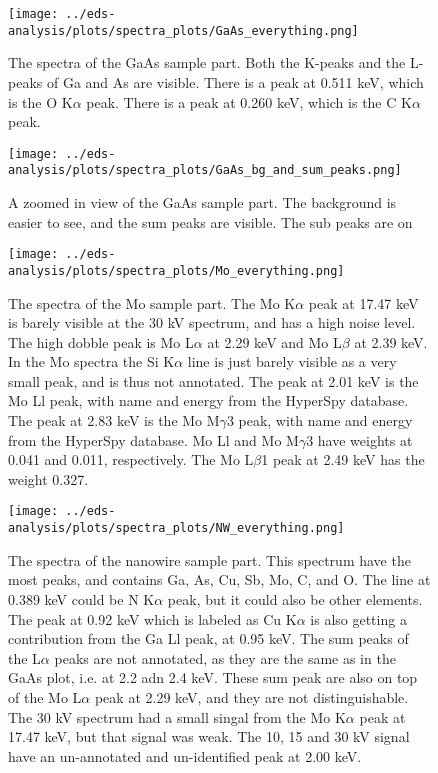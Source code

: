 \begin{figure}
    \centering
    \texttt{[image: ../eds-analysis/plots/spectra\_plots/GaAs\_everything.png]}
    \caption{
        The spectra of the GaAs sample part.
        Both the K-peaks and the L-peaks of Ga and As are visible.
        There is a peak at 0.511 keV, which is the O K$\alpha$ peak.
        There is a peak at 0.260 keV, which is the C K$\alpha$ peak.
    }
    \label{fig:results:Spectra_GaAs}
\end{figure}


\begin{figure}
    \centering
    \texttt{[image: ../eds-analysis/plots/spectra\_plots/GaAs\_bg\_and\_sum\_peaks.png]}
    \caption{
        A zoomed in view of the GaAs sample part.
        The background is easier to see, and the sum peaks are visible.
        The sub peaks are on 
    }
    \label{fig:results:Spectra_GaAs}
\end{figure}

\begin{figure}
    \centering
    \texttt{[image: ../eds-analysis/plots/spectra\_plots/Mo\_everything.png]}
    \caption{
        The spectra of the Mo sample part.
        The Mo K$\alpha$ peak at 17.47 keV is barely visible at the 30 kV spectrum, and has a high noise level.
        The high dobble peak is Mo L$\alpha$ at 2.29 keV and Mo L$\beta$ at 2.39 keV.
        In the Mo spectra the Si K$\alpha$ line is just barely visible as a very small peak, and is thus not annotated.
        The peak at 2.01 keV is the Mo Ll peak, with name and energy from the HyperSpy database.
        The peak at 2.83 keV is the Mo M$\gamma$3 peak, with name and energy from the HyperSpy database.
        Mo Ll and Mo M$\gamma$3 have weights at 0.041 and 0.011, respectively.
        The Mo L$\beta$1 peak at 2.49 keV has the weight 0.327.
    }
    \label{fig:results:Spectra_Mo}
\end{figure}

\begin{figure}
    \centering
    \texttt{[image: ../eds-analysis/plots/spectra\_plots/NW\_everything.png]}
    \caption{
        The spectra of the nanowire sample part.
        This spectrum have the most peaks, and contains Ga, As, Cu, Sb, Mo, C, and O.
        The line at 0.389 keV could be N K$\alpha$ peak, but it could also be other elements. %
        The peak at 0.92 keV which is labeled as Cu K$\alpha$ is also getting a contribution from the Ga Ll peak, at 0.95 keV. %
        The sum peaks of the L$\alpha$ peaks are not annotated, as they are the same as in the GaAs plot, i.e. at 2.2 adn 2.4 keV.
        These sum peak are also on top of the Mo L$\alpha$ peak at 2.29 keV, and they are not distinguishable.
        The 30 kV spectrum had a small singal from the Mo K$\alpha$ peak at 17.47 keV, but that signal was weak.
        The 10, 15 and 30 kV signal have an un-annotated and un-identified peak at 2.00 keV. %
    }
    \label{fig:results:Spectra_NW}
\end{figure}


